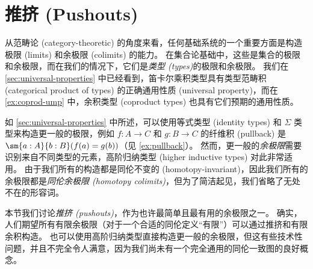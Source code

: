 %


\section{推挤 (Pushouts)}
\label{sec:colimits}

%
%
%
%
从范畴论 (category-theoretic) 的角度来看，任何基础系统的一个重要方面是构造极限 (limits) 和余极限 (colimits) 的能力。
在集合论基础中，这些是集合的极限和余极限，而在我们的情况下，它们是\emph{类型 (types)}的极限和余极限。
我们在 \cref{sec:universal-properties} 中已经看到，笛卡尔乘积类型具有类型范畴积 (categorical product of types) 的正确通用性质 (universal property)，而在 \cref{ex:coprod-ump} 中，余积类型 (coproduct types) 也具有它们预期的通用性质。

如 \cref{sec:universal-properties} 中所述，可以使用等式类型 (identity types) 和 $\Sigma$ 类型来构造更一般的极限，例如 $f:A\to C$ 和 $g:B\to C$ 的纤维积 (pullback) 是 $\sm{a:A}{b:B} (f(a)=g(b))$（见 \cref{ex:pullback}）。
然而，更一般的\emph{余极限}需要识别来自不同类型的元素，高阶归纳类型 (higher inductive types) 对此非常适用。
由于我们所有的构造都是同伦不变的 (homotopy-invariant)，因此我们所有的余极限都是\emph{同伦余极限 (homotopy colimits)}，但为了简洁起见，我们省略了无处不在的形容词。

本节我们讨论\emph{推挤 (pushouts)}，作为也许最简单且最有用的余极限之一。
确实，人们期望所有有限余极限（对于一个合适的同伦定义“有限”）可以通过推挤和有限余积构造。
也可以使用高阶归纳类型直接构造更一般的余极限，但这有些技术性问题，并且不完全令人满意，因为我们尚未有一个完全通用的同伦一致图的良好概念。

